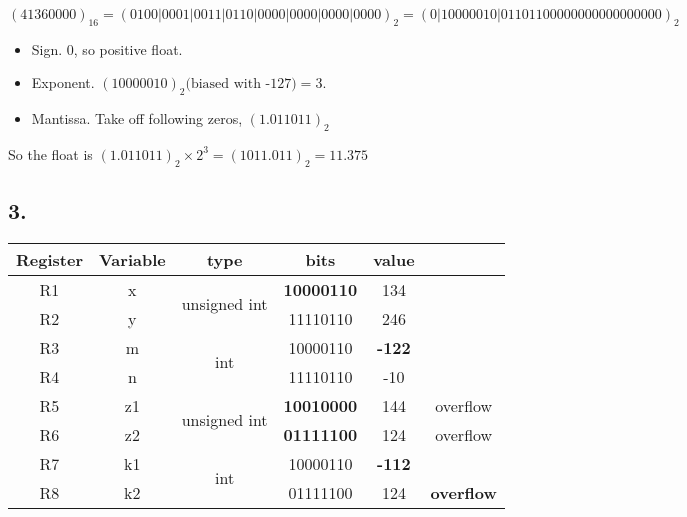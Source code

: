 \documentclass[11pt]{article}  %
\begin{document}
$(41360000)_{16} = (0100|0001|0011|0110|0000|0000|0000|0000)_2 = (0|10000010|01101100000000000000000)_2$
\begin{itemize}
    \item Sign. 0, so positive float.
    \item Exponent. $(10000010)_2\text{(biased with -127)}= 3$.
    \item Mantissa. Take off following zeros, $(1.011011)_2$
\end{itemize}
So the float is $(1.011011)_2\times 2^3 = (1011.011)_2 = 11.375$

\subsection*{3. }

\begin{table}[H]
    \centering
    \begin{tabular}{|c|c|c|c|c|c|}
    \hline
    Register & Variable & type                          & bits              & value         &                   \\ \hline
    R1       & x        & \multirow{2}{*}{unsigned int} & \textbf{10000110} & 134           &                   \\ \cline{1-2} \cline{4-6} 
    R2       & y        &                               & 11110110          & 246           &                   \\ \hline
    R3       & m        & \multirow{2}{*}{int}          & 10000110          & \textbf{-122} &                   \\ \cline{1-2} \cline{4-6} 
    R4       & n        &                               & 11110110          & -10           &                   \\ \hline
    R5       & z1       & \multirow{2}{*}{unsigned int} & \textbf{10010000} & 144           & overflow          \\ \cline{1-2} \cline{4-6} 
    R6       & z2       &                               & \textbf{01111100} & 124           & overflow          \\ \hline
    R7       & k1       & \multirow{2}{*}{int}          & 10000110          & \textbf{-112} &                   \\ \cline{1-2} \cline{4-6} 
    R8       & k2       &                               & 01111100          & 124           & \textbf{overflow} \\ \hline
    \end{tabular}
\end{table}
\end{document}
